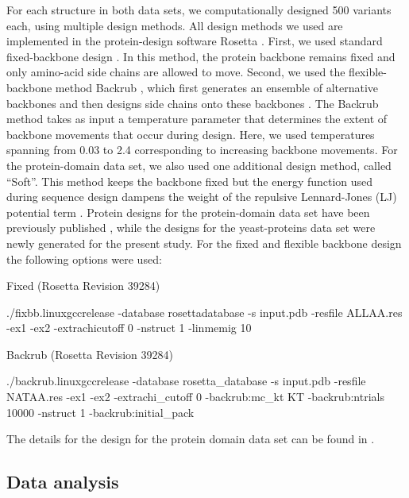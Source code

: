 \documentclass[12pt]{article}
\begin{document}
For each structure in both data sets, we computationally designed 500 variants each, using multiple design methods. All design methods we used are implemented in the protein-design software Rosetta \citep{LeaverFayetal2011}. First, we used standard fixed-backbone design \citep{Kuhlman2003}. In this method, the protein backbone remains fixed and only amino-acid side chains are allowed to move. Second, we used the flexible-backbone method Backrub \citep{Smith2008}, which first generates an ensemble of alternative backbones and then designs side chains onto these backbones \citep{Friedland2009, Smith2010}. The Backrub method takes as input a temperature parameter that determines the extent of backbone movements that occur during design. Here, we used temperatures spanning from 0.03 to 2.4 corresponding to increasing backbone movements. For the protein-domain data set, we also used one additional design method, called ``Soft''. This method keeps the backbone fixed but the energy function used during sequence design dampens the weight of the repulsive Lennard-Jones (LJ) potential term \citep{OllikainenKortemme}.  Protein designs for the protein-domain data set have been previously published \citep{OllikainenKortemme}, while the designs for the yeast-proteins data set were newly generated for the present study. For the fixed and flexible backbone design the following options were used: 

\noindent Fixed (Rosetta Revision 39284)

\noindent ./fixbb.linuxgccrelease -database rosetta\textunderscore database -s input.pdb -resfile ALLAA.res -ex1 -ex2 -extrachi\textunderscore cutoff 0 -nstruct 1 -linmem\textunderscore ig 10

\noindent Backrub (Rosetta Revision 39284)

\noindent ./backrub.linuxgccrelease -database rosetta\_database -s input.pdb -resfile NATAA.res -ex1 -ex2 -extrachi\_cutoff 0 -backrub:mc\_kt KT -backrub:ntrials 10000 -nstruct 1 -backrub:initial\_pack

\noindent The details for the design for the protein domain data set can be found in \citet{OllikainenKortemme}.

\subsection{Data analysis}
\end{document}
